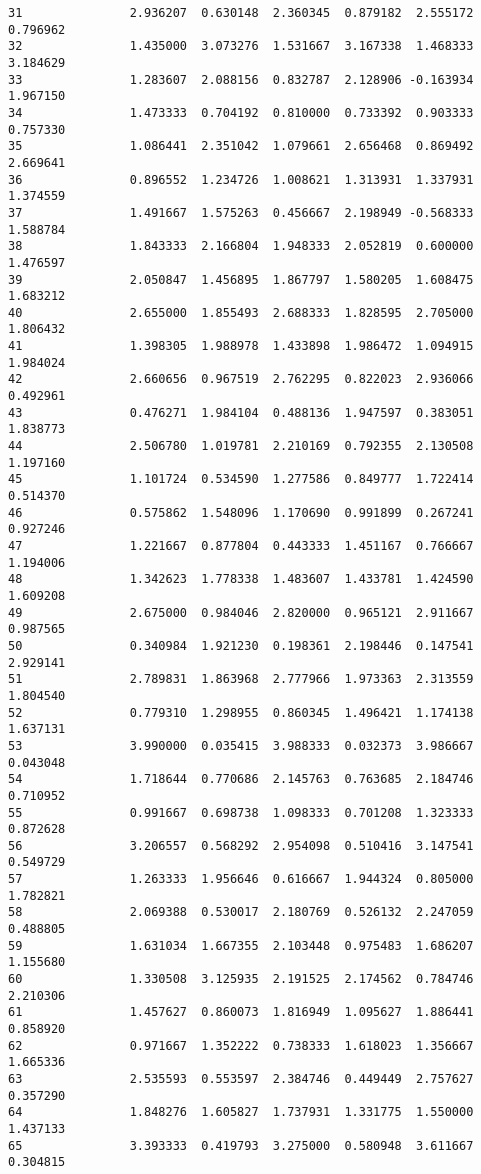 \documentclass[11pt]{article}
\begin{document}
\begin{Verbatim}[commandchars=\\\{\}]
31               2.936207  0.630148  2.360345  0.879182  2.555172  0.796962
32               1.435000  3.073276  1.531667  3.167338  1.468333  3.184629
33               1.283607  2.088156  0.832787  2.128906 -0.163934  1.967150
34               1.473333  0.704192  0.810000  0.733392  0.903333  0.757330
35               1.086441  2.351042  1.079661  2.656468  0.869492  2.669641
36               0.896552  1.234726  1.008621  1.313931  1.337931  1.374559
37               1.491667  1.575263  0.456667  2.198949 -0.568333  1.588784
38               1.843333  2.166804  1.948333  2.052819  0.600000  1.476597
39               2.050847  1.456895  1.867797  1.580205  1.608475  1.683212
40               2.655000  1.855493  2.688333  1.828595  2.705000  1.806432
41               1.398305  1.988978  1.433898  1.986472  1.094915  1.984024
42               2.660656  0.967519  2.762295  0.822023  2.936066  0.492961
43               0.476271  1.984104  0.488136  1.947597  0.383051  1.838773
44               2.506780  1.019781  2.210169  0.792355  2.130508  1.197160
45               1.101724  0.534590  1.277586  0.849777  1.722414  0.514370
46               0.575862  1.548096  1.170690  0.991899  0.267241  0.927246
47               1.221667  0.877804  0.443333  1.451167  0.766667  1.194006
48               1.342623  1.778338  1.483607  1.433781  1.424590  1.609208
49               2.675000  0.984046  2.820000  0.965121  2.911667  0.987565
50               0.340984  1.921230  0.198361  2.198446  0.147541  2.929141
51               2.789831  1.863968  2.777966  1.973363  2.313559  1.804540
52               0.779310  1.298955  0.860345  1.496421  1.174138  1.637131
53               3.990000  0.035415  3.988333  0.032373  3.986667  0.043048
54               1.718644  0.770686  2.145763  0.763685  2.184746  0.710952
55               0.991667  0.698738  1.098333  0.701208  1.323333  0.872628
56               3.206557  0.568292  2.954098  0.510416  3.147541  0.549729
57               1.263333  1.956646  0.616667  1.944324  0.805000  1.782821
58               2.069388  0.530017  2.180769  0.526132  2.247059  0.488805
59               1.631034  1.667355  2.103448  0.975483  1.686207  1.155680
60               1.330508  3.125935  2.191525  2.174562  0.784746  2.210306
61               1.457627  0.860073  1.816949  1.095627  1.886441  0.858920
62               0.971667  1.352222  0.738333  1.618023  1.356667  1.665336
63               2.535593  0.553597  2.384746  0.449449  2.757627  0.357290
64               1.848276  1.605827  1.737931  1.331775  1.550000  1.437133
65               3.393333  0.419793  3.275000  0.580948  3.611667  0.304815

\end{Verbatim}
\end{document}
